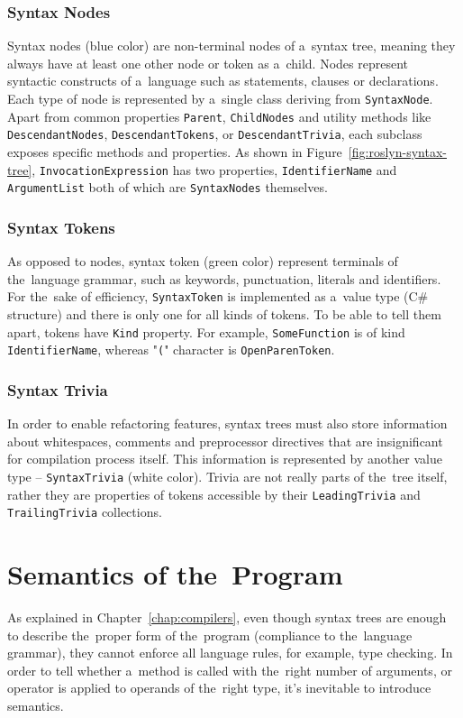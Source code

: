 \documentclass[
  digital, %
  table,   %
  lof,     %
  lot,     %
  oneside,
]{fithesis3}
\begin{document}
\subsubsection{Syntax Nodes}
Syntax nodes (blue color) are non-terminal nodes of a~syntax tree, meaning they always have at least one other node or token as a~child. Nodes represent syntactic constructs of a~language such as statements, clauses or declarations. Each type of node is represented by a~single class deriving from \texttt{SyntaxNode}. Apart from common properties \texttt{Parent}, \texttt{ChildNodes} and utility methods like \texttt{DescendantNodes}, \texttt{DescendantTokens}, or \texttt{DescendantTrivia}, each subclass exposes specific methods and properties. As shown in Figure~\ref{fig:roslyn-syntax-tree}, \texttt{InvocationExpression} has two properties, \texttt{IdentifierName} and \texttt{ArgumentList} both of which are \texttt{SyntaxNodes} themselves.
 
\subsubsection{Syntax Tokens}
As opposed to nodes, syntax token (green color) represent terminals of the~language grammar, such as keywords, punctuation, literals and identifiers. For the~sake of efficiency, \texttt{SyntaxToken} is implemented as a~value type (C\# structure) and there is only one for all kinds of tokens. To be able to tell them apart, tokens have \texttt{Kind} property. For example, \texttt{SomeFunction} is of kind \texttt{IdentifierName}, whereas "\texttt{(}" character is \texttt{OpenParenToken}.

\subsubsection{Syntax Trivia}
In order to enable refactoring features, syntax trees must also store information about whitespaces, comments and preprocessor directives that are insignificant for compilation process itself. This information is represented by another value type -- \texttt{SyntaxTrivia} (white color). Trivia are not really parts of the~tree itself, rather they are properties of tokens accessible by their \texttt{LeadingTrivia} and \texttt{TrailingTrivia} collections.

\section{Semantics of the~Program}
As explained in Chapter~\ref{chap:compilers}, even though syntax trees are enough to describe the~proper form of the~program (compliance to the~language grammar), they cannot enforce all language rules, for example, type checking. In order to tell whether a~method is called with the~right number of arguments, or operator is applied to operands of the~right type, it's inevitable to introduce semantics. 
\end{document}
